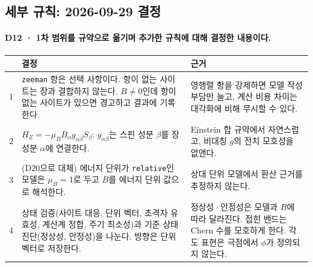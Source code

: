 \subsection{세부 규칙: 2026-09-29 결정}\label{detail-rules}
\begingroup%
  \framesubtitle{D12 · 1차 범위를 규약으로 옮기며 추가한 규칙에 대해 결정한 내용이다.}
  \small
  \begin{tabularx}{\textwidth}{@{}p{0.4cm}YP{4.9cm}@{}}
    \toprule
    & 결정 & 근거 \\
     & \texttt{zeeman} 항은 선택 사항이다. 항이 없는 사이트는 장과 결합하지 않는다.
      $B\neq0$인데 항이 없는 사이트가 있으면 경고하고 결과에 기록한다.
      & 영행렬 항을 강제하면 모델 작성 부담만 늘고, 계산 비용 차이는 대각화에 비해 무시할 수 있다. \\
    2 & $H_Z=-\mu_B B_\alpha g_{\alpha\beta}S_\beta$: $g_{\alpha\beta}$는 스핀 성분 $\beta$를 장 성분 $\alpha$에 연결한다.
      & Einstein 합 규약에서 자연스럽고, 비대칭 $g$의 전치 모호성을 없앤다. \\
    3 & (D20으로 대체) 에너지 단위가 \texttt{relative}인 모델은 $\mu_B=1$로 두고 $B$를 에너지 단위 값으로 해석한다.
      & 상대 단위 모델에서 환산 근거를 추정하지 않는다. \\
    4 & 상태 검증(사이트 대응, 단위 벡터, 초격자 유효성, 계산계 정합, 주기 최소성)과
      기준 상태 진단(정상성, 안정성)을 나눈다. 방향은 단위 벡터로 저장한다.
      & 정상성·안정성은 모델과 $B$에 따라 달라진다. 접힌 밴드는 Chern 수를 모호하게 한다.
      각도 표현은 극점에서 $\phi$가 정의되지 않는다. \\
    \bottomrule
  \end{tabularx}
  \par\medskip
\endgroup


